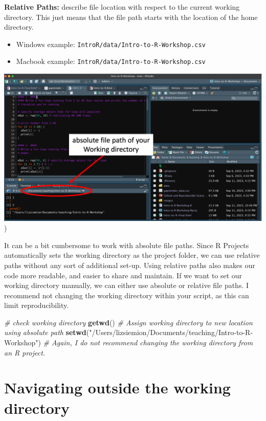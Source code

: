 \documentclass[
]{book}
\newenvironment{Shaded}{\begin{snugshade}}{\end{snugshade}}
\newcommand{\CommentTok}[1]{\textcolor[rgb]{0.56,0.35,0.01}{\textit{#1}}}
\newcommand{\FunctionTok}[1]{\textcolor[rgb]{0.13,0.29,0.53}{\textbf{#1}}}
\newcommand{\NormalTok}[1]{#1}
\newcommand{\StringTok}[1]{\textcolor[rgb]{0.31,0.60,0.02}{#1}}
\providecommand{\tightlist}{%
  \setlength{\itemsep}{0pt}\setlength{\parskip}{0pt}}
\begin{document}
\textbf{Relative Paths:} describe file location with respect to the current working directory. This just means that the file path starts with the location of the home directory.

\begin{itemize}
\tightlist
\item
  Windows example:
  \texttt{IntroR/data/Intro-to-R-Workshop.csv}
\item
  Macbook example:
  \texttt{IntroR/data/Intro-to-R-Workshop.csv}
\end{itemize}

\includegraphics[width=0.9\linewidth,height=\textheight,keepaspectratio]{./docs/files/RProjectFilePath.png})

It can be a bit cumbersome to work with absolute file paths. Since R Projects automatically sets the working directory as the project folder, we can use relative paths without any sort of additional set-up. Using relative paths also makes our code more readable, and easier to share and maintain. If we want to set our working directory manually, we can either use absolute or relative file paths. I recommend not changing the working directory within your script, as this can limit reproducibility.

\begin{Shaded}
\begin{Highlighting}[]
\CommentTok{\# check working directory}
\FunctionTok{getwd}\NormalTok{() }
\CommentTok{\# Assign working directory to new location using absolute path}
\FunctionTok{setwd}\NormalTok{(}\StringTok{"/Users/lizsiemion/Documents/teaching/Intro{-}to{-}R{-}Workshop"}\NormalTok{)}
\CommentTok{\# Again, I do not recommend changing the working directory from an R project.}
\end{Highlighting}
\end{Shaded}

\section{Navigating outside the working directory}\label{navigating-outside-the-working-directory}
\end{document}
